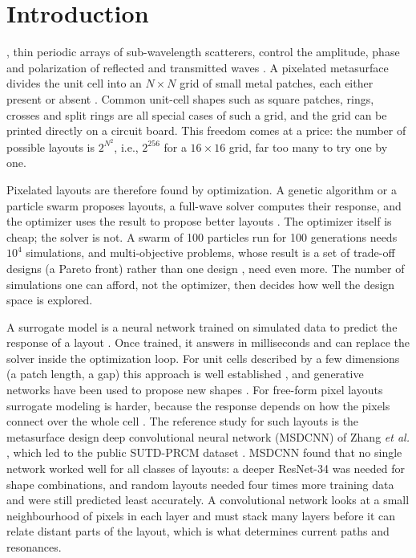 \documentclass[journal]{IEEEtran}
\begin{document}
\section{Introduction}
, thin periodic arrays of sub-wavelength scatterers, control the amplitude, phase and polarization of reflected and transmitted waves \cite{holloway,glybovski}. A pixelated metasurface divides the unit cell into an $N\times N$ grid of small metal patches, each either present or absent \cite{cui_coding}. Common unit-cell shapes such as square patches, rings, crosses and split rings are all special cases of such a grid, and the grid can be printed directly on a circuit board. This freedom comes at a price: the number of possible layouts is $2^{N^2}$, i.e., $2^{256}$ for a $16\times16$ grid, far too many to try one by one.

Pixelated layouts are therefore found by optimization. A genetic algorithm \cite{jafar_ga} or a particle swarm \cite{kennedy,robinson} proposes layouts, a full-wave solver computes their response, and the optimizer uses the result to propose better layouts \cite{zhang_sr2017,khatib_review}. The optimizer itself is cheap; the solver is not. A swarm of 100 particles run for 100 generations needs $10^4$ simulations, and multi-objective problems, whose result is a set of trade-off designs (a Pareto front) rather than one design \cite{coello_book,nsga2}, need even more. The number of simulations one can afford, not the optimizer, then decides how well the design space is explored.

A surrogate model is a neural network trained on simulated data to predict the response of a layout \cite{khatib_review}. Once trained, it answers in milliseconds and can replace the solver inside the optimization loop. For unit cells described by a few dimensions (a patch length, a gap) this approach is well established \cite{liu_tandem,malkiel,nadell,an_acsphot}, and generative networks have been used to propose new shapes \cite{liu_gan,ma_vae,jiang_glonet}. For free-form pixel layouts surrogate modeling is harder, because the response depends on how the pixels connect over the whole cell \cite{qiu_advsci}. The reference study for such layouts is the metasurface design deep convolutional neural network (MSDCNN) of Zhang \textit{et al.} \cite{msdcnn}, which led to the public SUTD-PRCM dataset \cite{sutd}. MSDCNN found that no single network worked well for all classes of layouts: a deeper ResNet-34 \cite{resnet} was needed for shape combinations, and random layouts needed four times more training data and were still predicted least accurately. A convolutional network looks at a small neighbourhood of pixels in each layer and must stack many layers before it can relate distant parts of the layout, which is what determines current paths and resonances.
\end{document}
